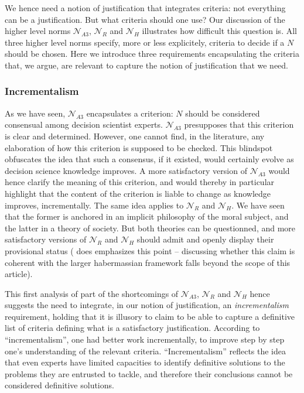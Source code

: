 \documentclass[preprint, french, english, 11pt, authoryear]{elsarticle}%
\begin{document}
We hence need a notion of justification that integrates criteria: not everything can be a justification. But what criteria should one use? Our discussion of the higher level norms $\mathscr{N}_{A3}$, $\mathscr{N}_{R}$ and $\mathscr{N}_{H}$ illustrates how difficult this question is. All three higher level norms specify, more or less explicitely, criteria to decide if a $N$ should be chosen. Here we introduce three requirements encapsulating the criteria that, we argue, are relevant to capture the notion of justification that we need.

\subsubsection{Incrementalism}
As we have seen, $\mathscr{N}_{A3}$ encapsulates a criterion: $N$ should be considered consensual among decision scientist experts. $\mathscr{N}_{A3}$ presupposes that this criterion is clear and determined. However, one cannot find, in the literature, any elaboration of how this criterion is supposed to be checked. This blindspot obfuscates the idea that such a consensus, if it existed, would certainly evolve as decision science knowledge improves. A more satisfactory version of $\mathscr{N}_{A3}$ would hence clarify the meaning of this criterion, and would thereby in particular highlight that the content of the criterion is liable to change as knowledge improves, incrementally. The same idea applies to $\mathscr{N}_{R}$ and $\mathscr{N}_{H}$. We have seen that the former is anchored in an implicit philosophy of the moral subject, and the latter in a theory of society. But both theories can be questionned, and more satisfactory versions of $\mathscr{N}_{R}$ and $\mathscr{N}_{H}$ should admit and openly display their provisional status (\cite{habermas_moralbewustsein_1983} does emphasizes this point -- discussing whether this claim is coherent with the larger habermassian framework falls beyond the scope of this article).

This first analysis of part of the shortcomings of $\mathscr{N}_{A3}$, $\mathscr{N}_{R}$ and $\mathscr{N}_{H}$ hence suggests the need to integrate, in our notion of justification, an \emph{incrementalism} requirement, holding that it is illusory to claim to be able to capture a definitive list of criteria defining what is a satisfactory justification. According to “incrementalism”, one had better work incrementally, to improve step by step one's understanding of the relevant criteria. “Incrementalism” reflects the idea that even experts have limited capacities to identify definitive solutions to the problems they are entrusted to tackle, and therefore their conclusions cannot be considered definitive solutions.
\end{document}
